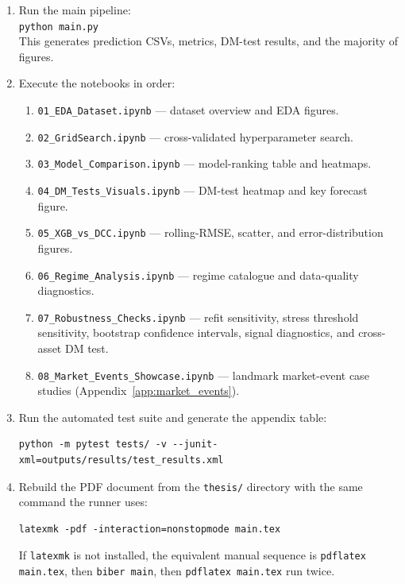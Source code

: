 \begin{enumerate}
    \item Run the main pipeline:\\
          \texttt{python main.py}\\
          This generates prediction CSVs, metrics, DM-test results, and the majority of figures.
    \item Execute the notebooks in order:
    \begin{enumerate}
        \item \texttt{01\_EDA\_Dataset.ipynb} --- dataset overview and EDA figures.
        \item \texttt{02\_GridSearch.ipynb} --- cross-validated hyperparameter search.
        \item \texttt{03\_Model\_Comparison.ipynb} --- model-ranking table and heatmaps.
        \item \texttt{04\_DM\_Tests\_Visuals.ipynb} --- DM-test heatmap and key forecast figure.
        \item \texttt{05\_XGB\_vs\_DCC.ipynb} --- rolling-RMSE, scatter, and error-distribution figures.
        \item \texttt{06\_Regime\_Analysis.ipynb} --- regime catalogue and data-quality diagnostics.
        \item \texttt{07\_Robustness\_Checks.ipynb} --- refit sensitivity, stress threshold sensitivity, bootstrap confidence intervals, signal diagnostics, and cross-asset DM test.
        \item \texttt{08\_Market\_Events\_Showcase.ipynb} --- landmark market-event case studies (Appendix~\ref{app:market_events}).
    \end{enumerate}
    \item Run the automated test suite and generate the appendix table:
\begin{lstlisting}[language={}]
python -m pytest tests/ -v --junit-xml=outputs/results/test_results.xml
\end{lstlisting}
    \item Rebuild the PDF document from the \texttt{thesis/} directory with the same command the runner uses:
\begin{lstlisting}[language={}]
latexmk -pdf -interaction=nonstopmode main.tex
\end{lstlisting}
    If \texttt{latexmk} is not installed, the equivalent manual sequence is \texttt{pdflatex main.tex}, then \texttt{biber main}, then \texttt{pdflatex main.tex} run twice.
\end{enumerate}

